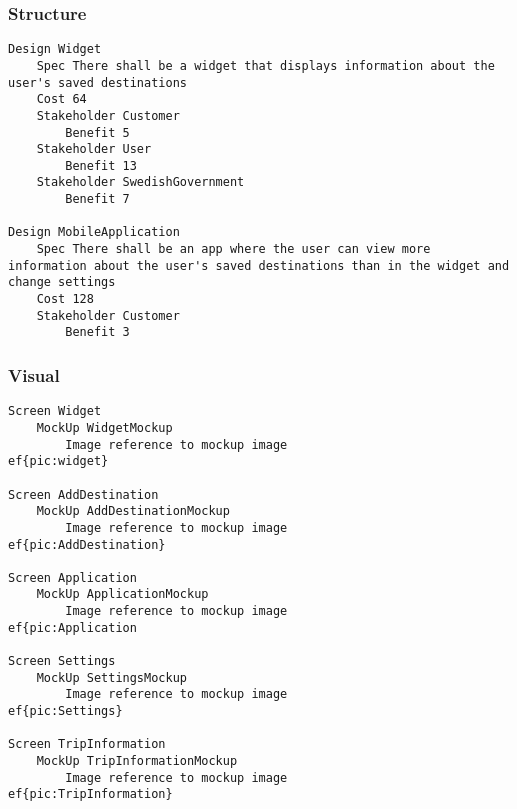 \begin{lstlisting}

\end{lstlisting}


			 \subsubsection{Structure}


\begin{lstlisting}
Design Widget
	Spec There shall be a widget that displays information about the user's saved destinations
	Cost 64
	Stakeholder Customer
		Benefit 5
	Stakeholder User
		Benefit 13
	Stakeholder SwedishGovernment
		Benefit 7

Design MobileApplication
	Spec There shall be an app where the user can view more information about the user's saved destinations than in the widget and change settings
	Cost 128
	Stakeholder Customer
		Benefit 3

\end{lstlisting}
		
				
			 \subsubsection{Visual}


\begin{lstlisting}
Screen Widget
	MockUp WidgetMockup
		Image reference to mockup image 
ef{pic:widget}

Screen AddDestination
	MockUp AddDestinationMockup
		Image reference to mockup image 
ef{pic:AddDestination}

Screen Application
	MockUp ApplicationMockup
		Image reference to mockup image 
ef{pic:Application

Screen Settings
	MockUp SettingsMockup
		Image reference to mockup image 
ef{pic:Settings}

Screen TripInformation
	MockUp TripInformationMockup
		Image reference to mockup image 
ef{pic:TripInformation}

\end{lstlisting}
